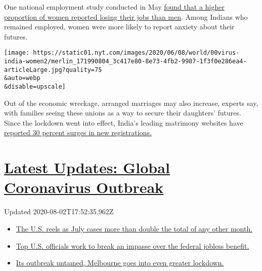 One national employment study conducted in May
\href{https://www.outlookindia.com/newsscroll/women-people-in-semiurban-areas-bear-the-brunt-of-job-losses/1836606}{found
that a higher proportion of women reported losing their jobs than men}.
Among Indians who remained employed, women were more likely to report
anxiety about their futures.

\texttt{[image: https://static01.nyt.com/images/2020/06/08/world/00virus-india-women2/merlin\_171990804\_3c417e80-8e73-4fb2-9987-1f3f0e286ea4-articleLarge.jpg?quality=75\\\&auto=webp\\\&disable=upscale]}

Out of the economic wreckage, arranged marriages may also increase,
experts say, with families seeing these unions as a way to secure their
daughters' futures. Since the lockdown went into effect, India's leading
matrimony websites have
\href{https://www.thehindu.com/business/online-matchmaker-sign-ups-increase-30/article31434245.ece}{reported
30 percent surges in new registrations.}

\hypertarget{latest-updates-global-coronavirus-outbreak}{%
\section{\texorpdfstring{\href{https://www.nytimes.com/2020/08/01/world/coronavirus-covid-19.html?action=click\&pgtype=Article\&state=default\&region=MAIN_CONTENT_1\&context=storylines_live_updates}{Latest
Updates: Global Coronavirus
Outbreak}}{Latest Updates: Global Coronavirus Outbreak}}\label{latest-updates-global-coronavirus-outbreak}}

Updated 2020-08-02T17:52:35.962Z

\begin{itemize}
\tightlist
\item
  \href{https://www.nytimes.com/2020/08/01/world/coronavirus-covid-19.html?action=click\&pgtype=Article\&state=default\&region=MAIN_CONTENT_1\&context=storylines_live_updates\#link-34047410}{The
  U.S. reels as July cases more than double the total of any other
  month.}
\item
  \href{https://www.nytimes.com/2020/08/01/world/coronavirus-covid-19.html?action=click\&pgtype=Article\&state=default\&region=MAIN_CONTENT_1\&context=storylines_live_updates\#link-780ec966}{Top
  U.S. officials work to break an impasse over the federal jobless
  benefit.}
\item
  \href{https://www.nytimes.com/2020/08/01/world/coronavirus-covid-19.html?action=click\&pgtype=Article\&state=default\&region=MAIN_CONTENT_1\&context=storylines_live_updates\#link-2bc8948}{Its
  outbreak untamed, Melbourne goes into even greater lockdown.}
\end{itemize}

